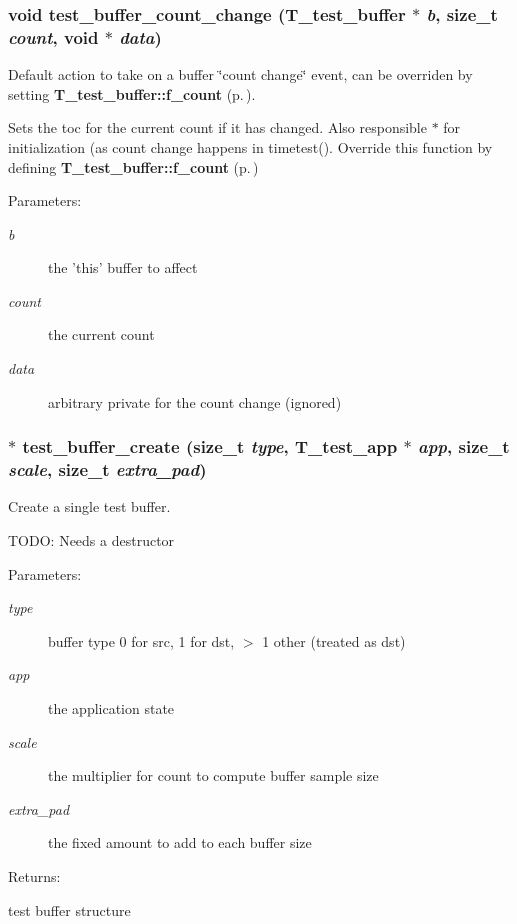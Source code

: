 \subsubsection{\setlength{\rightskip}{0pt plus 5cm}void test\_\-buffer\_\-count\_\-change ({\bf T\_\-test\_\-buffer} $\ast$ {\em b}, size\_\-t {\em count}, void $\ast$ {\em data})}\label{group__test__buffer_a8}


Default action to take on a buffer \char`\"{}count change\char`\"{} event, can be overriden by setting {\bf T\_\-test\_\-buffer::f\_\-count} {\rm (p.\,\pageref{structT__test__buffer_m22})}.

Sets the toc for the current count if it has changed. Also responsible $\ast$ for initialization (as count change happens in timetest(). Override this function by defining {\bf T\_\-test\_\-buffer::f\_\-count} {\rm (p.\,\pageref{structT__test__buffer_m22})} \begin{Desc}
\item[Parameters: ]\par
\begin{description}
\item[{\em 
b}]the 'this' buffer to affect \item[{\em 
count}]the current count \item[{\em 
data}]arbitrary private for the count change (ignored) \end{description}
\end{Desc}
\subsubsection{$\ast$ test\_\-buffer\_\-create (size\_\-t {\em type}, {\bf T\_\-test\_\-app} $\ast$ {\em app}, size\_\-t {\em scale}, size\_\-t {\em extra\_\-pad})}\label{group__test__buffer_a6}


Create a single test buffer.

TODO: Needs a destructor \begin{Desc}
\item[Parameters: ]\par
\begin{description}
\item[{\em 
type}]buffer type 0 for src, 1 for dst, $>$ 1 other (treated as dst) \item[{\em 
app}]the application state \item[{\em 
scale}]the multiplier for count to compute buffer sample size \item[{\em 
extra\_\-pad}]the fixed amount to add to each buffer size \end{description}
\end{Desc}
\begin{Desc}
\item[Returns: ]\par
test buffer structure \end{Desc}
